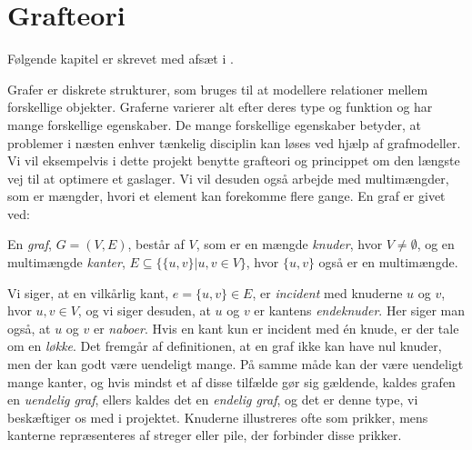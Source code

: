 \chapter{Grafteori} \label{kap:grafteori}
Følgende kapitel er skrevet med afsæt i \citep{dmat}.

Grafer er diskrete strukturer, som bruges til at modellere relationer mellem forskellige objekter.  Graferne varierer alt efter deres type og funktion og har mange forskellige egenskaber. De mange forskellige egenskaber betyder, at problemer i næsten enhver tænkelig disciplin kan løses ved hjælp af grafmodeller. Vi vil eksempelvis i dette projekt benytte grafteori og princippet om den længste vej til at optimere et gaslager. Vi vil desuden også arbejde med multimængder, som er mængder, hvori et element kan forekomme flere gange. En graf er givet ved:

\begin{defn}[Graf] \label{def:graf}
En \emph{graf}, $G = (V,E)$, består af $V$, som er en mængde \emph{knuder}, hvor $V \neq \emptyset$, og en multimængde \emph{kanter}, $E \subseteq \{\{u,v\}|u,v \in V \}$, hvor $\{u,v\}$ også er en multimængde. 
\end{defn}

Vi siger, at en vilkårlig kant, $e = \{u,v\} \in E$, er \emph{incident} med knuderne $u$ og $v$, hvor $u, v \in V$, og vi siger desuden, at $u$ og $v$ er kantens \emph{endeknuder}. Her siger man også, at $u$ og $v$ er \emph{naboer}. 
Hvis en kant kun er incident med én knude, er der tale om en \emph{løkke}.
Det fremgår af definitionen, at en graf ikke kan have nul knuder, men der kan godt være uendeligt mange. På samme måde kan der være uendeligt mange kanter, og hvis mindst et af disse tilfælde gør sig gældende, kaldes grafen en \emph{uendelig graf}, ellers kaldes det en \emph{endelig graf}, og det er denne type, vi beskæftiger os med i projektet.
Knuderne illustreres ofte som prikker, mens kanterne repræsenteres af streger eller pile, der forbinder disse prikker. 
















